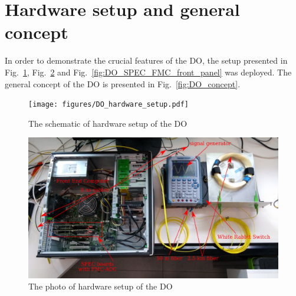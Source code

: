 \section{Hardware setup and general concept} \label{section:hardware_setup}
    In order to demonstrate the crucial features of the DO, the setup presented in Fig.~\ref{fig:DO_hardware_setup}, Fig.~\ref{fig:DO_hardware_setup_photo} and Fig.~\ref{fig:DO_SPEC_FMC_front_panel} was deployed. The general concept of the DO is presented in Fig.~\ref{fig:DO_concept}.
    \begin{figure}
    	\centerline{\texttt{[image: figures/DO\_hardware\_setup.pdf]}}
    	\caption{The schematic of hardware setup of the DO}
    	\label{fig:DO_hardware_setup}
    \end{figure}
    \begin{figure}
    	\centerline{\includegraphics[width=\textwidth]{figures/DO_hardware_setup_photo.png}}
    	\caption{The photo of hardware setup of the DO}
    	\label{fig:DO_hardware_setup_photo}
    \end{figure}
